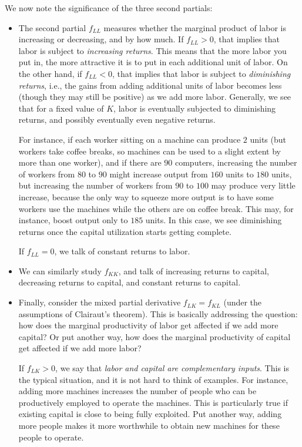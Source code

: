\documentclass[10pt]{amsart}
\begin{document}
We now note the significance of the three second partials:

\begin{itemize}
\item The second partial $f_{LL}$ measures whether the marginal
  product of labor is increasing or decreasing, and by how much. If
  $f_{LL} > 0$, that implies that labor is subject to {\em increasing
  returns}. This means that the more labor you put in, the more
  attractive it is to put in each additional unit of labor. On the
  other hand, if $f_{LL} < 0$, that implies that labor is subject to
  {\em diminishing returns}, i.e., the gains from adding additional
  units of labor becomes less (though they may still be positive) as
  we add more labor. Generally, we see that for a fixed value of $K$,
  labor is eventually subjected to diminishing returns, and possibly
  eventually even negative returns.

  For instance, if each worker sitting on a machine can produce $2$
  units (but workers take coffee breaks, so machines can be used to a
  slight extent by more than one worker), and if there are $90$
  computers, increasing the number of workers from $80$ to $90$ might
  increase output from $160$ units to $180$ units, but increasing the
  number of workers from $90$ to $100$ may produce very little
  increase, because the only way to squeeze more output is to have
  some workers use the machines while the others are on coffee
  break. This may, for instance, boost output only to $185$ units. In
  this case, we see diminishing returns once the capital utilization
  starts getting complete.

  If $f_{LL} = 0$, we talk of constant returns to labor.
\item We can similarly study $f_{KK}$, and talk of increasing returns
  to capital, decreasing returns to capital, and constant returns to
  capital.
\item Finally, consider the mixed partial derivative $f_{LK} =f_{KL}$
  (under the assumptions of Clairaut's theorem). This is basically
  addressing the question: how does the marginal productivity of labor
  get affected if we add more capital? Or put another way, how does
  the marginal productivity of capital get affected if we add more
  labor?

  If $f_{LK} > 0$, we say that {\em labor and capital are
  complementary inputs}. This is the typical situation, and it is not
  hard to think of examples. For instance, adding more machines
  increases the number of people who can be productively employed to
  operate the machines. This is particularly true if existing capital
  is close to being fully exploited. Put another way, adding more
  people makes it more worthwhile to obtain new machines for these
  people to operate.


\end{itemize}
\end{document}
